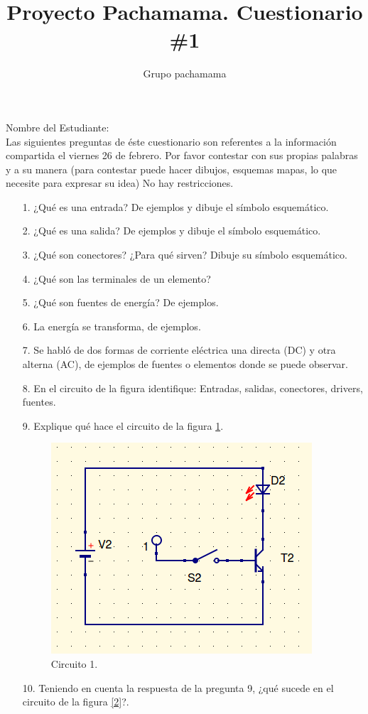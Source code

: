 \documentclass{article}
\title{Proyecto Pachamama. Cuestionario \#1}
\author{Grupo pachamama}
\begin{document}
\maketitle
Nombre del Estudiante:\\

Las siguientes preguntas de éste cuestionario son referentes a la información compartida el viernes 26 de febrero.
Por favor contestar con sus propias palabras y a su manera (para contestar puede hacer dibujos, esquemas mapas, lo que necesite para expresar su idea) No hay restricciones.

\begin{itemize}
		\item [1.] ¿Qué es una entrada? De ejemplos y dibuje el símbolo esquemático. 
		\item [2.] ¿Qué es una salida? De ejemplos y dibuje el símbolo esquemático.
		\item [3.] ¿Qué son conectores? ¿Para qué sirven? Dibuje su símbolo esquemático.
		\item [4.] ¿Qué son las terminales de un elemento?
		\item [5.] ¿Qué son fuentes de energía? De ejemplos.
		\item [6.] La energía se transforma, de ejemplos.
		\item [7.] Se habló de dos formas de corriente eléctrica una directa (DC) y otra alterna (AC), de ejemplos
				de fuentes o elementos donde se puede observar.
		\item [8.] En el circuito de la figura identifique: Entradas, salidas, conectores, drivers, fuentes.
		\item [9.] Explique qué hace el circuito de la figura \ref{1}.
\begin{figure}[hptp]
    \centering
    \includegraphics[scale=0.35]{circuito2.png}
    \caption{Circuito 1.}
    \label{1}
\end{figure}
\smallskip
		\item [10.] Teniendo en cuenta la respuesta de la pregunta 9, ¿qué sucede en el circuito de la figura \ref{2}?.


\end{itemize}
\end{document}
